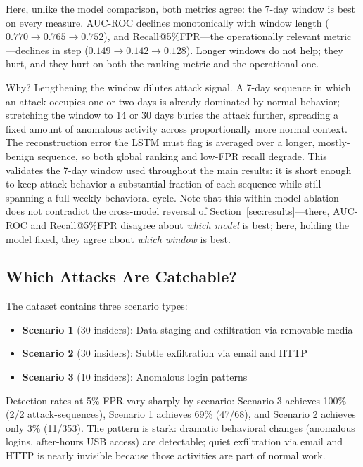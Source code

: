\documentclass[conference]{IEEEtran}
\begin{document}
Here, unlike the model comparison, both metrics agree: the 7-day window is best on every measure. AUC-ROC declines monotonically with window length ($0.770 \to 0.765 \to 0.752$), and Recall@5\%FPR---the operationally relevant metric---declines in step ($0.149 \to 0.142 \to 0.128$). Longer windows do not help; they hurt, and they hurt on both the ranking metric and the operational one.

Why? Lengthening the window dilutes attack signal. A 7-day sequence in which an attack occupies one or two days is already dominated by normal behavior; stretching the window to 14 or 30 days buries the attack further, spreading a fixed amount of anomalous activity across proportionally more normal context. The reconstruction error the LSTM must flag is averaged over a longer, mostly-benign sequence, so both global ranking and low-FPR recall degrade. This validates the 7-day window used throughout the main results: it is short enough to keep attack behavior a substantial fraction of each sequence while still spanning a full weekly behavioral cycle. Note that this within-model ablation does not contradict the cross-model reversal of Section~\ref{sec:results}---there, AUC-ROC and Recall@5\%FPR disagree about \emph{which model} is best; here, holding the model fixed, they agree about \emph{which window} is best.

\subsection{Which Attacks Are Catchable?}

The dataset contains three scenario types:

\begin{itemize}
    \item \textbf{Scenario 1} (30 insiders): Data staging and exfiltration via removable media
    \item \textbf{Scenario 2} (30 insiders): Subtle exfiltration via email and HTTP
    \item \textbf{Scenario 3} (10 insiders): Anomalous login patterns
\end{itemize}

Detection rates at 5\% FPR vary sharply by scenario: Scenario 3 achieves 100\% (2/2 attack-sequences), Scenario 1 achieves 69\% (47/68), and Scenario 2 achieves only 3\% (11/353). The pattern is stark: dramatic behavioral changes (anomalous logins, after-hours USB access) are detectable; quiet exfiltration via email and HTTP is nearly invisible because those activities are part of normal work.
\end{document}
